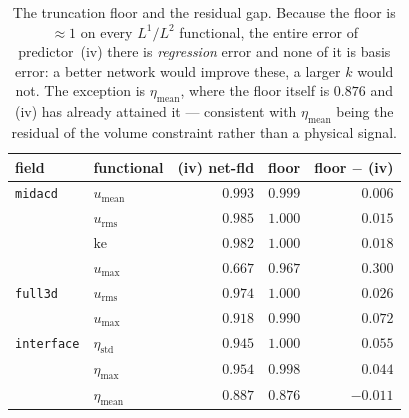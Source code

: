 \documentclass[11pt,a4paper]{article}
\theoremstyle{plain}
\theoremstyle{definition}
\theoremstyle{remark}
\begin{document}
\begin{table}[t]
\centering
\small
\begin{tabular}{@{}llrrr@{}}
\toprule
field & functional & (iv) net-fld & floor & floor $-$ (iv) \\
\midrule
\texttt{midacd}
 & $u_{\mathrm{mean}}$ & $0.993$ & $0.999$ & $0.006$ \\
 & $u_{\mathrm{rms}}$  & $0.985$ & $1.000$ & $0.015$ \\
 & $\mathrm{ke}$       & $0.982$ & $1.000$ & $0.018$ \\
 & $u_{\max}$          & $0.667$ & $0.967$ & $0.300$ \\
\texttt{full3d}
 & $u_{\mathrm{rms}}$  & $0.974$ & $1.000$ & $0.026$ \\
 & $u_{\max}$          & $0.918$ & $0.990$ & $0.072$ \\
\texttt{interface}
 & $\eta_{\mathrm{std}}$ & $0.945$ & $1.000$ & $0.055$ \\
 & $\eta_{\max}$         & $0.954$ & $0.998$ & $0.044$ \\
 & $\eta_{\mathrm{mean}}$& $0.887$ & $0.876$ & $-0.011$ \\
\bottomrule
\end{tabular}
\caption{The truncation floor and the residual gap. Because the floor is
$\approx 1$ on every $L^1/L^2$ functional, the entire error of predictor~(iv)
there is \emph{regression} error and none of it is basis error: a better network
would improve these, a larger $k$ would not. The exception is
$\eta_{\mathrm{mean}}$, where the floor itself is $0.876$ and (iv) has already
attained it --- consistent with $\eta_{\mathrm{mean}}$ being the residual of the
volume constraint rather than a physical signal.}
\label{tab:floor}
\end{table}

\label{meas:t1}
\end{document}
